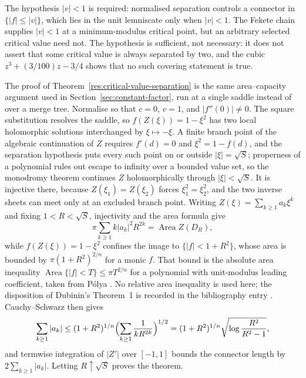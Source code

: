 \documentclass[11pt]{article}
\begin{document}
\noindent The hypothesis $|v|<1$ is required: normalised separation controls a
connector in $\{|f|\le|v|\}$, which lies in the unit lemniscate only when
$|v|<1$.  The Fekete chain supplies $|v|<1$ at a minimum-modulus critical
point, but an arbitrary selected critical value need not.
The hypothesis is sufficient, not necessary: it does not assert that some
critical value is always separated by two, and the cubic
$z^3+(3/100)z-3/4$ shows that no such covering statement is true.

The proof of Theorem~\ref{res:critical-value-separation} is the same
area--capacity argument used in Section~\ref{sec:constant-factor}, run at a
single saddle instead of over a merge tree.  Normalise so that $c=0$, $v=1$,
and $|f''(0)|\ne0$.  The square substitution resolves the saddle, so
$f(Z(\xi))=1-\xi^2$ has two local holomorphic solutions interchanged by
$\xi\mapsto-\xi$.  A finite branch point of the algebraic continuation of $Z$
requires $f'(d)=0$ and $\xi^2=1-f(d)$, and the separation hypothesis puts every
such point on or outside $|\xi|=\sqrt S$; properness of a polynomial rules out
escape to infinity over a bounded value set, so the monodromy theorem continues
$Z$ holomorphically through $|\xi|<\sqrt S$.  It is injective there, because
$Z(\xi_1)=Z(\xi_2)$ forces $\xi_1^2=\xi_2^2$, and the two inverse sheets can
meet only at an excluded branch point.  Writing $Z(\xi)=\sum_{k\ge1}a_k\xi^k$
and fixing $1<R<\sqrt S$, injectivity and the area formula give
\[
  \pi\sum_{k\ge1}k|a_k|^2R^{2k}=\operatorname{Area}Z(D_R),
\]
while $f(Z(\xi))=1-\xi^2$ confines the image to $\{|f|<1+R^2\}$, whose area
is bounded by $\pi(1+R^2)^{2/n}$ for a monic $f$.  That bound is the absolute
area inequality $\operatorname{Area}\{|f|<T\}\le\pi T^{2/n}$ for a polynomial
with unit-modulus leading coefficient, taken from P\'olya
\cite[printed pp.~280--282]{polya1928}.  No relative area inequality is used
here; the disposition of Dubinin's Theorem~1 is recorded in the bibliography
entry \cite{dubinin}.  Cauchy--Schwarz then gives
\[
  \sum_{k\ge1}|a_k|
    \le(1+R^2)^{1/n}\Bigl(\sum_{k\ge1}\frac1{kR^{2k}}\Bigr)^{1/2}
    =(1+R^2)^{1/n}\sqrt{\log\frac{R^2}{R^2-1}},
\]
and termwise integration of $|Z'|$ over $[-1,1]$ bounds the connector length by
$2\sum_{k\ge1}|a_k|$.  Letting $R\uparrow\sqrt S$ proves the theorem.
\end{document}
